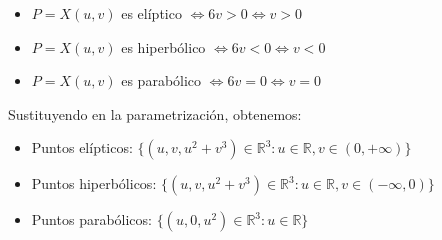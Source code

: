 \documentclass{article}
\begin{document}
\begin{itemize}
    \item $P = X(u,v)$ es elíptico $\iff 6v > 0 \iff v > 0$
    \item $P = X(u,v)$ es hiperbólico $\iff 6v < 0 \iff v < 0$
    \item $P = X(u,v)$ es parabólico $\iff 6v = 0 \iff v = 0$
\end{itemize}
Sustituyendo en la parametrización, obtenemos:
\begin{itemize}
    \item Puntos elípticos: $\{(u,v,u^2+v^3) \in \mathbb{R}^3 : u \in \mathbb{R}, v \in (0, +\infty)\}$
    \item Puntos hiperbólicos: $\{(u,v,u^2+v^3) \in \mathbb{R}^3 : u \in \mathbb{R}, v \in (-\infty, 0)\}$
    \item Puntos parabólicos: $\{(u,0,u^2) \in \mathbb{R}^3 : u \in \mathbb{R}\}$
\end{itemize}
\end{document}
